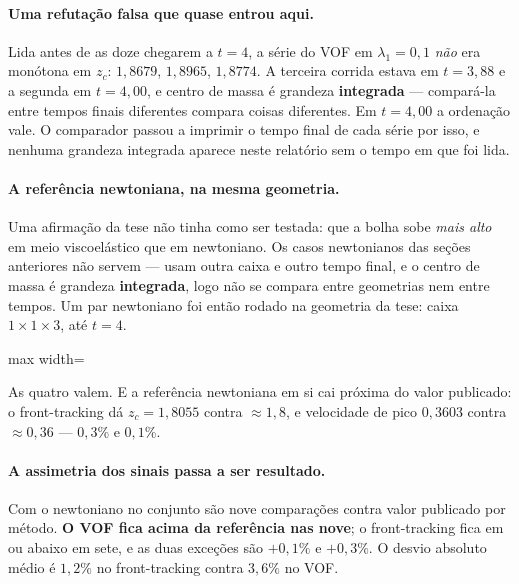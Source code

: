 \paragraph{Uma refuta\c{c}\~ao falsa que quase entrou aqui.} Lida antes de as
doze chegarem a $t=4$, a s\'erie do VOF em $\lambda_1 = 0{,}1$ \emph{n\~ao} era
mon\'otona em $z_c$: $1{,}8679$, $1{,}8965$, $1{,}8774$. A terceira corrida
estava em $t=3{,}88$ e a segunda em $t=4{,}00$, e centro de massa \'e grandeza
\textbf{integrada} --- compar\'a-la entre tempos finais diferentes compara coisas
diferentes. Em $t=4{,}00$ a ordena\c{c}\~ao vale. O comparador passou a imprimir
o tempo final de cada s\'erie por isso, e nenhuma grandeza integrada aparece
neste relat\'orio sem o tempo em que foi lida.

\paragraph{A refer\^encia newtoniana, na mesma geometria.} Uma afirma\c{c}\~ao
da tese n\~ao tinha como ser testada: que a bolha sobe \emph{mais alto} em meio
viscoel\'astico que em newtoniano. Os casos newtonianos das se\c{c}\~oes
anteriores n\~ao servem --- usam outra caixa e outro tempo final, e o centro de
massa \'e grandeza \textbf{integrada}, logo n\~ao se compara entre geometrias
nem entre tempos. Um par newtoniano foi ent\~ao rodado na geometria da tese:
caixa $1\times1\times3$, at\'e $t=4$.

\begin{adjustbox}{max width=\linewidth}
\end{adjustbox}

As quatro valem. E a refer\^encia newtoniana em si cai pr\'oxima do valor
publicado: o front-tracking d\'a $z_c = 1{,}8055$ contra $\approx 1{,}8$, e
velocidade de pico $0{,}3603$ contra $\approx 0{,}36$ --- $0{,}3\%$ e
$0{,}1\%$.

\paragraph{A assimetria dos sinais passa a ser resultado.} Com o newtoniano no
conjunto s\~ao nove compara\c{c}\~oes contra valor publicado por m\'etodo.
\textbf{O VOF fica acima da refer\^encia nas nove}; o front-tracking fica em ou
abaixo em sete, e as duas exce\c{c}\~oes s\~ao $+0{,}1\%$ e $+0{,}3\%$. O desvio
absoluto m\'edio \'e $1{,}2\%$ no front-tracking contra $3{,}6\%$ no VOF.

